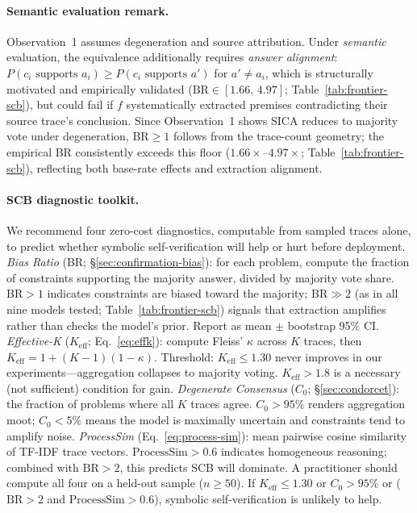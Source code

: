\paragraph{Semantic evaluation remark.}
\label{app:semantic-remark}
Observation~1 assumes degeneration and source attribution. Under \emph{semantic} evaluation, the equivalence additionally requires \emph{answer alignment}: $P(c_i \text{ supports } a_i) \geq P(c_i \text{ supports } a')$ for $a' \neq a_i$, which is structurally motivated and empirically validated ($\mathrm{BR} \in [1.66,\, 4.97]$; Table~\ref{tab:frontier-scb}), but could fail if $f$ systematically extracted premises contradicting their source trace's conclusion.
Since Observation~1 shows SICA reduces to majority vote under degeneration, $\mathrm{BR} \geq 1$ follows from the trace-count geometry; the empirical BR consistently exceeds this floor ($1.66\times$--$4.97\times$; Table~\ref{tab:frontier-scb}), reflecting both base-rate effects and extraction alignment.

\paragraph{SCB diagnostic toolkit.}
\label{app:diagnostic-toolkit}
We recommend four zero-cost diagnostics, computable from sampled traces alone, to predict whether symbolic self-verification will help or hurt before deployment.
\emph{Bias Ratio} (BR; \S\ref{sec:confirmation-bias}): for each problem, compute the fraction of constraints supporting the majority answer, divided by majority vote share. $\text{BR} > 1$ indicates constraints are biased toward the majority; $\text{BR} \gg 2$ (as in all nine models tested; Table~\ref{tab:frontier-scb}) signals that extraction amplifies rather than checks the model's prior. Report as mean $\pm$ bootstrap 95\% CI.
\emph{Effective-K} ($K_\text{eff}$; Eq.~\ref{eq:effk}): compute Fleiss' $\kappa$ across $K$ traces, then $K_\text{eff} = 1 + (K-1)(1-\kappa)$. Threshold: $K_\text{eff} \leq 1.30$ never improves in our experiments---aggregation collapses to majority voting. $K_\text{eff} > 1.8$ is a necessary (not sufficient) condition for gain.
\emph{Degenerate Consensus} ($C_0$; \S\ref{sec:condorcet}): the fraction of problems where all $K$ traces agree. $C_0 > 95\%$ renders aggregation moot; $C_0 < 5\%$ means the model is maximally uncertain and constraints tend to amplify noise.
\emph{ProcessSim} (Eq.~\ref{eq:process-sim}): mean pairwise cosine similarity of TF-IDF trace vectors. $\text{ProcessSim} > 0.6$ indicates homogeneous reasoning; combined with $\text{BR} > 2$, this predicts SCB will dominate.
A practitioner should compute all four on a held-out sample ($n \geq 50$). If $K_\text{eff} \leq 1.30$ or $C_0 > 95\%$ or ($\text{BR} > 2$ and $\text{ProcessSim} > 0.6$), symbolic self-verification is unlikely to help.

